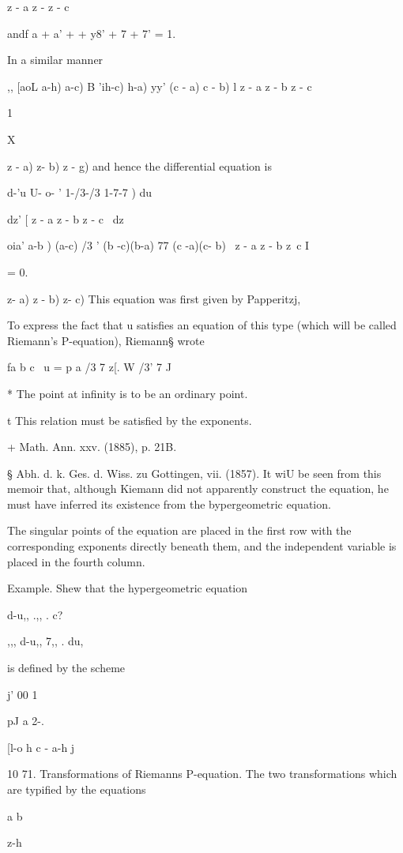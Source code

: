   z - a z - z - c

andf a + a' + + y8' + 7 + 7' = 1.

In a similar manner

,, [aoL a-h) a-c) B 'ih-c) h-a) yy' (c - a) c - b) l z - a z - b z - c

1

X

 z - a) z- b) z - g) and hence the differential equation is

d-'u U- o- ' 1-/3-/3 1-7-7 ) du

dz' [ z - a z - b z - c \ dz

  oia' a-b ) (a-c) /3 ' (b -c)(b-a) 77 (c -a)(c- b) \ z - a z - b z~c
I

= 0.

 z- a) z - b) z- c) This equation was first given by Papperitzj,

To express the fact that u satisfies an equation of this type (which
will be called Riemann's P-equation), Riemann§ wrote

fa b c \ u = p a /3 7 z[. W /3' 7 J

* The point at infinity is to be an ordinary point.

t This relation must be satisfied by the exponents.

+ Math. Ann. xxv. (1885), p. 21B.

§ Abh. d. k. Ges. d. Wiss. zu Gottingen, vii. (1857). It wiU be seen
from this memoir that, although Kiemann did not apparently construct
the equation, he must have inferred its existence from the
bypergeometric equation.

%
%

The singular points of the equation are placed in the first row with
the corresponding exponents directly beneath them, and the independent
variable is placed in the fourth column.

Example. Shew that the hypergeometric equation

d-u,, .,, . c?

,,, d-u,, 7,, . du,

is defined by the scheme

j' 00 1 \

pJ a 2-.

[l-o h c - a-h j

10 71. Transformations of Riemanns P-equation. The two transformations
which are typified by the equations

a b

z-h

